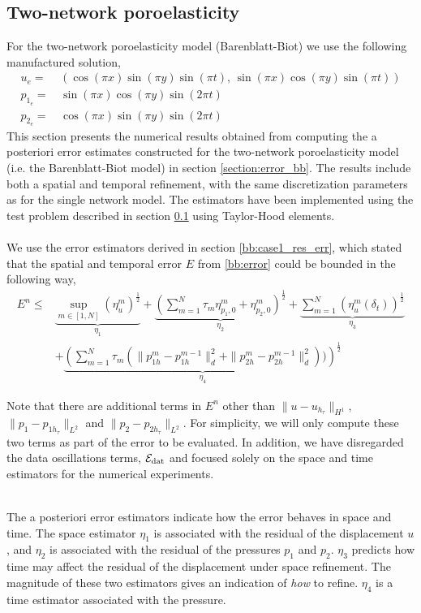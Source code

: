 \subsection{Two-network poroelasticity} \label{test_bb}
For the two-network poroelasticity model (Barenblatt-Biot) we use the following manufactured solution,
\begin{align*}
u_e = & \, \left(\cos(\pi x)\sin(\pi y)\sin(\pi t), \, \sin( \pi x)\cos(\pi y)\sin(\pi t)\right) \\
p_{1_e} = & \,\sin(\pi x) \cos(\pi y)\sin(2\pi t)  \\
p_{2_e} = & \,\cos(\pi x) \sin(\pi y)\sin(2\pi t)
\end{align*}
This section presents the numerical results obtained from computing the a posteriori error estimates constructed for the two-network poroelasticity model (i.e. the Barenblatt-Biot model) in section  \ref{section:error_bb}. The results include both a spatial and temporal refinement, with the same discretization parameters as for the single network model. The estimators have been implemented using the test problem described in section \ref{test_bb} using Taylor-Hood elements.
\\
\\
We use the error estimators derived in section \ref{bb:case1_res_err}, which stated that the spatial and temporal error $E$ from \eqref{bb:error} could be bounded in the following way,
\begin{align} 
E^n \leq & \underbrace{\sup_{m \in [1,N]} (\eta^m_u)^\frac{1}{2}}_{\eta_1} + \underbrace{\left(\sum_{m=1}^N \tau_m \eta^m_{p_1,0} + \eta^m_{p_2,0}\right)^\frac{1}{2}}_{\eta_2} + \underbrace{\sum_{m=1}^N (\eta^m_u(\delta_t))^\frac{1}{2}}_{\eta_3} \\
& + \underbrace{\left(\sum_{m=1}^N \tau_m (\|p^m_{1h} - p^{m-1}_{1h}\|_d^2 + \|p^m_{2h} - p^{m-1}_{2h}\|_d^2) )\right)^\frac{1}{2}}_{\eta_4}
\end{align}
\begin{remark}
Note that there are additional terms in $E^n$ other than $\|u - u_{h_{\tau}}\|_{H^1}$, $\|p_1 - p_{1h_{\tau}}\|_{L^2}$ and $\|p_2 - p_{2h_{\tau}}\|_{L^2}$. For simplicity, we will only compute these two terms as part of the error to be evaluated. In addition, we have disregarded the data oscillations terms, $\mathcal{E}_{\textnormal{dat}}$ and focused solely on the space and time estimators for the numerical experiments.
\end{remark}
\mbox{}\\
The a posteriori error estimators indicate how the error behaves in space and time. The space estimator $\eta_1$ is associated with the residual of the displacement $u$, and $\eta_2$ is associated with the residual of the pressures $p_1$ and $p_2$. $\eta_3$ predicts how time may affect the residual of the displacement under space refinement. The magnitude of these two estimators gives an indication of \textit{how} to refine. $\eta_4$ is a time estimator associated with the pressure. 
